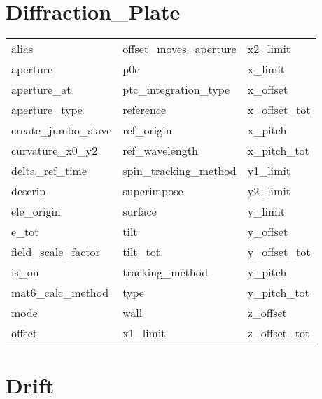  \section{Diffraction_Plate}
 \label{s:list.diffraction.plate}
 
 \begin{tabular}{lll} \toprule
alias                       & offset_moves_aperture       & x2_limit                    \\
aperture                    & p0c                         & x_limit                     \\
aperture_at                 & ptc_integration_type        & x_offset                    \\
aperture_type               & reference                   & x_offset_tot                \\
create_jumbo_slave          & ref_origin                  & x_pitch                     \\
curvature_x0_y2             & ref_wavelength              & x_pitch_tot                 \\
delta_ref_time              & spin_tracking_method        & y1_limit                    \\
descrip                     & superimpose                 & y2_limit                    \\
ele_origin                  & surface                     & y_limit                     \\
e_tot                       & tilt                        & y_offset                    \\
field_scale_factor          & tilt_tot                    & y_offset_tot                \\
is_on                       & tracking_method             & y_pitch                     \\
mat6_calc_method            & type                        & y_pitch_tot                 \\
mode                        & wall                        & z_offset                    \\
offset                      & x1_limit                    & z_offset_tot                \\
 \bottomrule
 \end{tabular}
 \vfill
 
 \section{Drift}
 \label{s:list.drift}
 
